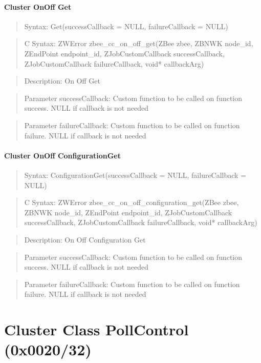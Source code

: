 \paragraph{Cluster OnOff Get}
\begin{quote}Syntax: Get(successCallback = NULL, failureCallback = NULL)\end{quote}
\begin{quote}C Syntax: ZWError zbee\_cc\_on\_off\_get(ZBee zbee, ZBNWK node\_id, ZEndPoint endpoint\_id, ZJobCustomCallback successCallback, ZJobCustomCallback failureCallback, void* callbackArg)\end{quote}
\begin{quote}Description: On Off Get\end{quote}
\begin{quote}Parameter successCallback: Custom function to be called on function success. NULL if callback is not needed\end{quote}
\begin{quote}Parameter failureCallback: Custom function to be called on function failure. NULL if callback is not needed\end{quote}


\paragraph{Cluster OnOff ConfigurationGet}
\begin{quote}Syntax: ConfigurationGet(successCallback = NULL, failureCallback = NULL)\end{quote}
\begin{quote}C Syntax: ZWError zbee\_cc\_on\_off\_configuration\_get(ZBee zbee, ZBNWK node\_id, ZEndPoint endpoint\_id, ZJobCustomCallback successCallback, ZJobCustomCallback failureCallback, void* callbackArg)\end{quote}
\begin{quote}Description: On Off Configuration Get\end{quote}
\begin{quote}Parameter successCallback: Custom function to be called on function success. NULL if callback is not needed\end{quote}
\begin{quote}Parameter failureCallback: Custom function to be called on function failure. NULL if callback is not needed\end{quote}



\section{Cluster Class PollControl (0x0020/32)}

